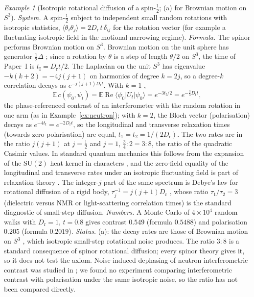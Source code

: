 \documentclass[aps,pra,onecolumn,superscriptaddress,nofootinbib,10pt]{revtex4-2}
\theoremstyle{definition}
\theoremstyle{remark}
\newtheorem{example}[theorem]{Example}
\newcommand{\SU}{\mathrm{SU}}
\begin{document}
\begin{example}[Isotropic rotational diffusion of a spin-$\tfrac12$; (a) for Brownian motion on $S^3$]\label{ex:diffusion}
\emph{System.}  A spin-$\tfrac12$ subject to independent small random rotations with isotropic statistics,
$\langle\theta_i\theta_j\rangle=2D_{\mathrm r}\,t\,\delta_{ij}$ for the rotation vector (for example a fluctuating isotropic field in
the motional-narrowing regime).
\emph{Formula.}  The spinor performs Brownian motion on $S^3$.  Brownian motion on the unit sphere has generator
$\tfrac12\Delta$ \cite[Thm.~7.2(c)]{PaperI}; since a rotation by $\theta$ is a step of length $\theta/2$ on $S^3$, the time of
Paper~I is $t_{\mathrm I}=D_{\mathrm r}t/2$.  The Laplacian on the unit $S^3$ has eigenvalue $-k(k+2)=-4j(j+1)$ on
harmonics of degree $k=2j$, so a degree-$k$ correlation decays as $e^{-j(j+1)D_{\mathrm r}t}$.  With $k=1$ \cite[Prop.~7.4]{PaperI},
\[
\mathbb E\,c(\psi_0,\psi_t)=\mathbb E\operatorname{Re}\langle\psi_0|U_t|\psi_0\rangle=e^{-3t_{\mathrm I}/2}=e^{-\frac34D_{\mathrm r}t},
\]
the phase-referenced contrast of an interferometer with the random rotation in one arm (as in
Example~\ref{ex:neutron}); with $k=2$, the Bloch vector (polarisation) decays as $e^{-4t_{\mathrm I}}=e^{-2D_{\mathrm r}t}$, so
the longitudinal and transverse relaxation times (towards zero polarisation) are equal,
$t_1=t_2=1/(2D_{\mathrm r})$.  The two rates are in the ratio $j(j+1)$ at $j=\tfrac12$ and $j=1$, $\tfrac34:2=3:8$, the
ratio of the quadratic Casimir values.  In standard quantum mechanics this follows from the expansion
of the $\SU(2)$ heat kernel in characters \cite{ex-Favro60}, and the zero-field equality of the
longitudinal and transverse rates under an isotropic fluctuating field is part of relaxation theory
\cite{ex-Abragam61}.  The integer-$j$ part of the same spectrum is Debye's law for rotational diffusion of a
rigid body, $\tau_j^{-1}=j(j+1)D_{\mathrm r}$ \cite{ex-Debye29,ex-Favro60}, whose ratio $\tau_1/\tau_2=3$ (dielectric versus NMR
or light-scattering correlation times) is the standard diagnostic of small-step diffusion.
\emph{Numbers.}  A Monte Carlo of $4\times10^4$ random walks with $D_{\mathrm r}=1$, $t=0.8$ gives contrast $0.549$
(formula $0.5488$) and polarisation $0.205$ (formula $0.2019$).
\emph{Status.}  (a): the decay rates are those of Brownian motion on $S^3$ \cite[Prop.~7.4]{PaperI}, which isotropic small-step
rotational noise produces.  The ratio $3:8$ is a standard consequence of spinor rotational diffusion;
every spinor theory gives it, so it does not test the axiom.  Noise-induced dephasing of neutron
interferometric contrast was studied in \cite{ex-Sulyok10}; we found no experiment comparing
interferometric contrast with polarisation under the same isotropic noise, so the ratio has not been
compared directly.
\end{example}
\end{document}
